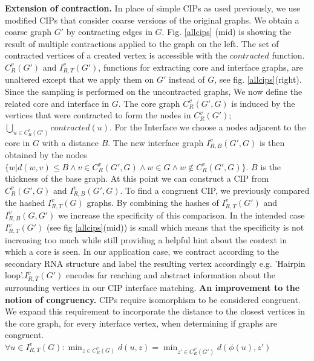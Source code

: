 \documentclass{article}
\begin{document}
\textbf{ Extension of contraction.}
In place of simple CIPs as used previously,
we use modified CIPs that consider coarse versions
of the original graphs. We obtain a coarse graph $G'$ by contracting edges
in $G$. Fig. \ref{allcips} (mid) is showing the result of multiple contractions
applied to the graph on the left. The set of contracted vertices of a
created vertex is accessible with the $contracted$ function.
$C_{R}^v(G')$ and $I_{R,T}^v(G')$, functions for extracting core and
interface graphs, are unaltered except that we apply them
on $G'$ instead of $G$, see fig. \ref{allcips}(right).
Since the sampling is performed on the uncontracted graphs,
We now define the related core and interface in $G$.
The core graph $C_{R}^v(G',G)$ is induced by the vertices that were contracted
 to form the nodes in $C_{R}^v(G')$;
$\bigcup_{u \in C_R^v(G')} contracted(u)$.
For the Interface we choose a nodes adjacent to the core in $G$ with a distance $B$.
The new interface graph $I_{R,B}^v(G',G)$ is then obtained by the nodes 
$\{ w | d(w,v) \leq B \wedge v\in C_R^v(G',G) \wedge w \in G \wedge w 
\notin C_R^v(G',G) \}$.  $B$ is the thickness of the base graph.
At this point we can construct a CIP from $C_R^v(G',G)$ and $I_{R,B}^v(G',G)$. 
To find a congruent CIP, we previously compared the hashed $I_{R,T}^v(G)$ 
graphs. By combining the hashes of $I_{R,T}^v(G')$ and $I_{R,B}^v(G,G')$ we
increase the specificity of this comparison.
In the intended case $I_{R,T}^v(G')$ (see fig \ref{allcips}(mid)) is small
which means that the
specificity is not increasing too much while still providing
a helpful hint about the context in which a core is seen.
In our application case, we contract according to the
secondary RNA structure and label the resulting vertex accordingly e.g.
'Hairpin loop'.$I_{R,T}^v(G')$  encodes far reaching and abstract
information about the surrounding vertices in our CIP interface matching.
\textbf{An improvement to the notion of congruency.}
CIPs require isomorphism to be considered congruent.
We expand this requirement to incorporate
the distance to the closest vertices in the core graph, for every interface
vertex, when determining if graphs are congruent.
$\forall u \in I_{R,T}^v(G) : 
\min_{z \in  C_{R}^v(G)} d(u,z) = 
\min_{z' \in  C_{R}^{v'}(G')} d(\phi(u),z') $
\end{document}
